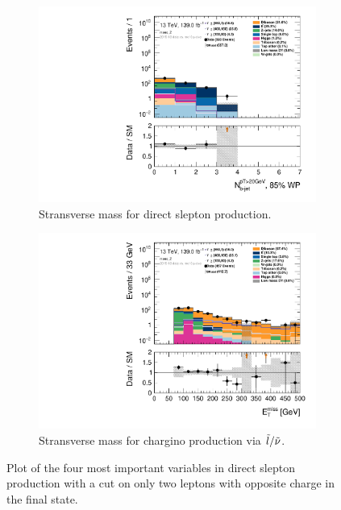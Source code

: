 \begin{figure}[H] \ContinuedFloat
\centering
    \begin{subfigure}[t!]{0.49\textwidth}
        \includegraphics[width=\textwidth]{Figures/MonoZcuts/hist1d_nBJet20_MV2c10_FixedCutBEff_85_mono_Z.pdf}
    \caption{Stransverse mass for direct slepton production.}
    \label{fig:my_label}
    \end{subfigure}
    \begin{subfigure}[t!]{0.49\textwidth}
        \includegraphics[width=\textwidth]{Figures/MonoZcuts/hist1d_met_Et_mono_Z.pdf}
    \caption{Stransverse mass for chargino production via $\Tilde{l}/\Tilde{\nu}$.}
    \label{fig:my_label}
    \end{subfigure}
    \caption{Plot of the four most important variables in direct slepton production with a cut on only two leptons with opposite charge in the final state.}
    \label{fig:cutandcountStepsDM}
\end{figure}
\restoregeometry